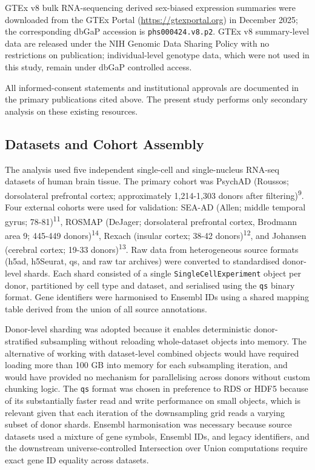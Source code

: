 \documentclass[
]{article}
\begin{document}
GTEx v8 bulk RNA-sequencing derived sex-biased expression summaries were
downloaded from the GTEx Portal (\url{https://gtexportal.org}) in
December 2025; the corresponding dbGaP accession is
\texttt{phs000424.v8.p2}. GTEx v8 summary-level data are released under
the NIH Genomic Data Sharing Policy with no restrictions on publication;
individual-level genotype data, which were not used in this study,
remain under dbGaP controlled access.

All informed-consent statements and institutional approvals are
documented in the primary publications cited above. The present study
performs only secondary analysis on these existing resources.

\subsection{Datasets and Cohort
Assembly}\label{datasets-and-cohort-assembly}

The analysis used five independent single-cell and single-nucleus
RNA-seq datasets of human brain tissue. The primary cohort was PsychAD
(Roussos; dorsolateral prefrontal cortex; approximately 1,214-1,303
donors after filtering)\textsuperscript{9}. Four external cohorts were
used for validation: SEA-AD (Allen; middle temporal gyrus;
78-81)\textsuperscript{11}, ROSMAP (DeJager; dorsolateral prefrontal
cortex, Brodmann area 9; 445-449 donors)\textsuperscript{14}, Rexach
(insular cortex; 38-42 donors)\textsuperscript{12}, and Johansen
(cerebral cortex; 19-33 donors)\textsuperscript{13}. Raw data from
heterogeneous source formats (h5ad, h5Seurat, qs, and raw tar archives)
were converted to standardised donor-level shards. Each shard consisted
of a single \texttt{SingleCellExperiment} object per donor, partitioned
by cell type and dataset, and serialised using the \texttt{qs} binary
format. Gene identifiers were harmonised to Ensembl IDs using a shared
mapping table derived from the union of all source annotations.

Donor-level sharding was adopted because it enables deterministic
donor-stratified subsampling without reloading whole-dataset objects
into memory. The alternative of working with dataset-level combined
objects would have required loading more than 100 GB into memory for
each subsampling iteration, and would have provided no mechanism for
parallelising across donors without custom chunking logic. The
\texttt{qs} format was chosen in preference to RDS or HDF5 because of
its substantially faster read and write performance on small objects,
which is relevant given that each iteration of the downsampling grid
reads a varying subset of donor shards. Ensembl harmonisation was
necessary because source datasets used a mixture of gene symbols,
Ensembl IDs, and legacy identifiers, and the downstream
universe-controlled Intersection over Union computations require exact
gene ID equality across datasets.
\end{document}
